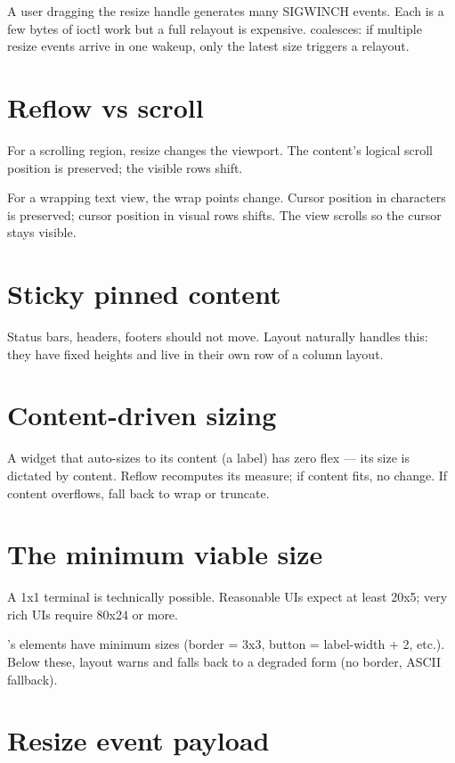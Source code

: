 A user dragging the resize handle generates many SIGWINCH
events. Each is a few bytes of ioctl work but a full
relayout is expensive. \maya{} coalesces: if multiple
resize events arrive in one wakeup, only the latest size
triggers a relayout.

\section{Reflow vs scroll}

For a scrolling region, resize changes the viewport. The
content's logical scroll position is preserved; the visible
rows shift.

For a wrapping text view, the wrap points change. Cursor
position in characters is preserved; cursor position in
visual rows shifts. The view scrolls so the cursor stays
visible.

\section{Sticky pinned content}

Status bars, headers, footers should not move. Layout
naturally handles this: they have fixed heights and live in
their own row of a column layout.

\section{Content-driven sizing}

A widget that auto-sizes to its content (a label) has zero
flex --- its size is dictated by content. Reflow recomputes
its measure; if content fits, no change. If content
overflows, fall back to wrap or truncate.

\section{The minimum viable size}

A 1x1 terminal is technically possible. Reasonable UIs
expect at least 20x5; very rich UIs require 80x24 or more.

\maya{}'s elements have minimum sizes (border = 3x3, button
= label-width + 2, etc.). Below these, layout warns and
falls back to a degraded form (no border, ASCII fallback).

\section{Resize event payload}

